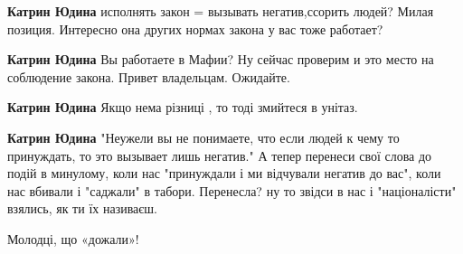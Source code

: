 \begin{itemize}
\begin{itemize}
 
\textbf{Катрин Юдина} исполнять закон = вызывать негатив,ссорить людей? Милая позиция. Интересно она других нормах закона у вас тоже работает?

 
\textbf{Катрин Юдина} Вы работаете в Мафии? Ну сейчас проверим и это место на соблюдение закона. Привет владельцам. Ожидайте.

 
\textbf{Катрин Юдина} Якщо нема різниці , то тоді змийтеся в унітаз.

 
\textbf{Катрин Юдина} "Неужели вы не понимаете, что если людей к чему то
принуждать, то это вызывает лишь негатив." А тепер перенеси свої слова до подій
в минулому, коли нас "принуждали і ми відчували негатив до вас", коли нас
вбивали і "саджали" в табори. Перенесла? ну то звідси в нас і "націоналісти"
взялись, як ти їх називаєш.

\end{itemize}

 
Молодці, що «дожали»!

\begin{itemize}
 

\end{itemize}
\end{itemize}
